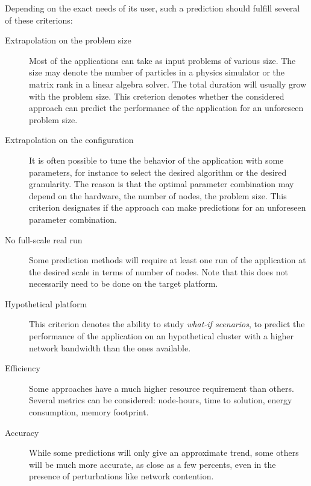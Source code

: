         Depending on the exact needs of its user, such a prediction should fulfill several of these criterions:
        \begin{description}
            \item[Extrapolation on the problem size] Most of the applications can take as input problems of various
                size. The size may denote the number of particles in a physics simulator or the matrix rank in a linear
                algebra solver. The total duration will usually grow with the problem size. This creterion denotes
                whether the considered approach can predict the performance of the application for an unforeseen problem
                size.
            \item[Extrapolation on the configuration] It is often possible to tune the behavior of the application with
                some parameters, for instance to select the desired algorithm or the desired granularity. The reason is
                that the optimal parameter combination may depend on the hardware, the number of nodes, the problem
                size. This criterion designates if the approach can make predictions for an unforeseen parameter
                combination.
            \item[No full-scale real run] Some prediction methods will require at least one run of the application at
                the desired scale in terms of number of nodes. Note that this does not necessarily need to be done on
                the target platform.
            \item[Hypothetical platform] This criterion denotes the ability to study \emph{what-if scenarios}, \eg to
                predict the performance of the application on an hypothetical cluster with a higher network bandwidth
                than the ones available.
            \item[Efficiency] Some approaches have a much higher resource requirement than others. Several metrics can
                be considered: node-hours, time to solution, energy consumption, memory footprint.
            \item[Accuracy] While some predictions will only give an approximate trend, some others will be much more
                accurate, as close as a few percents, even in the presence of perturbations like network contention.
        \end{description}


